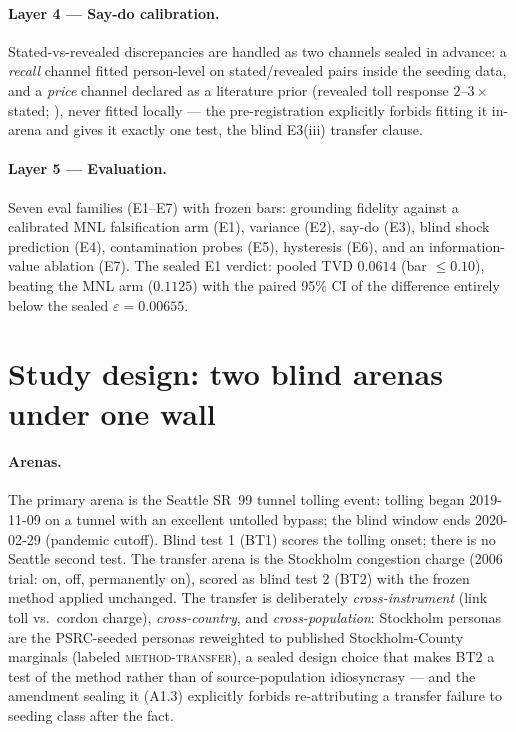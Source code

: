 \documentclass[11pt]{article}
\begin{document}
\paragraph{Layer 4 --- Say-do calibration.} Stated-vs-revealed
discrepancies are handled as two channels sealed in advance: a
\emph{recall} channel fitted person-level on stated/revealed pairs
inside the seeding data, and a \emph{price} channel declared as a
literature prior (revealed toll response $2$--$3\times$ stated;
\citealp{brownstone2005}), never fitted locally --- the pre-registration
explicitly forbids fitting it in-arena and gives it exactly one test,
the blind E3(iii) transfer clause.

\paragraph{Layer 5 --- Evaluation.} Seven eval families (E1--E7) with
frozen bars: grounding fidelity against a calibrated MNL falsification
arm (E1), variance (E2), say-do (E3), blind shock prediction (E4),
contamination probes (E5), hysteresis (E6), and an information-value
ablation (E7). The sealed E1 verdict: pooled TVD $0.0614$ (bar
$\leq 0.10$), beating the MNL arm ($0.1125$) with the paired 95\% CI of
the difference entirely below the sealed $\varepsilon=0.00655$.

\section{Study design: two blind arenas under one wall}
\label{sec:design}

\paragraph{Arenas.} The primary arena is the Seattle SR~99 tunnel
tolling event: tolling began 2019-11-09 on a tunnel with an excellent
untolled bypass; the blind window ends 2020-02-29 (pandemic cutoff).
Blind test 1 (BT1) scores the tolling onset; there is no Seattle second
test. The transfer arena is the Stockholm congestion charge
(2006 trial: on, off, permanently on), scored as blind test 2 (BT2)
with the frozen method applied unchanged. The transfer is deliberately
\emph{cross-instrument} (link toll vs.\ cordon charge),
\emph{cross-country}, and \emph{cross-population}: Stockholm personas
are the PSRC-seeded personas reweighted to published Stockholm-County
marginals (labeled \textsc{method-transfer}), a sealed design choice
that makes BT2 a test of the method rather than of source-population
idiosyncrasy --- and the amendment sealing it (A1.3) explicitly forbids
re-attributing a transfer failure to seeding class after the fact.
\end{document}
